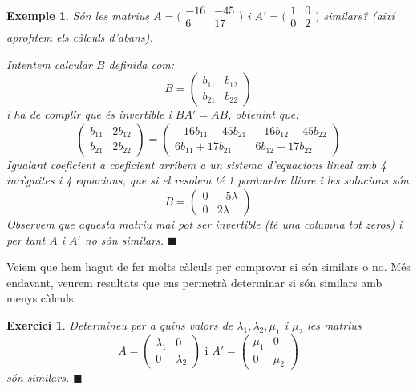 \documentclass[
  11pt,
]{book}
\numberwithin{dummy}{section}
\theoremstyle{maincolornumbox}
\newtheorem{exerciseT}{Exercici}[chapter]
\theoremstyle{blacknumex}
\newtheorem{exampleT}{Exemple}[chapter]
\theoremstyle{blacknumbox}
\theoremstyle{maincolornum}
\newenvironment{exercise}{\begin{eBox}\begin{exerciseT}}{\hfill{\color{maincolor}\tiny\ensuremath{\blacksquare}}\end{exerciseT}\end{eBox}}
\newenvironment{example}{\begin{exampleT}}{\hfill{\tiny\ensuremath{\blacksquare}}\end{exampleT}}
\begin{document}
\begin{example}
Són les matrius
\(A=\big(\begin{smallmatrix} -16 & -45 \\ 6 & 17\end{smallmatrix}\big)\)
i \(A'=\big(\begin{smallmatrix} 1 & 0 \\ 0 & 2 \end{smallmatrix}\big)\)
similars? (així aprofitem els càlculs d'abans).

Intentem calcular \(B\) definida com:
\[B=\begin{pmatrix} b_{11} & b_{12} \\ b_{21} & b_{22} \end{pmatrix}\] i
ha de complir que és invertible i \(BA'=AB\), obtenint que:
\[\begin{pmatrix}
    b_{11} & 2b_{12} \\ b_{21} & 2b_{22}
    \end{pmatrix}
    =
    \begin{pmatrix}
    -16b_{11}-45b_{21} & -16b_{12}-45b_{22}\\ 6b_{11}+17b_{21} & 6b_{12}+17b_{22}
    \end{pmatrix}\] Igualant coeficient a coeficient arribem a un
sistema d'equacions lineal amb 4 incògnites i 4 equacions, que si el
resolem té 1 paràmetre lliure i les solucions són \[B=\begin{pmatrix}
    0 & -5\lambda \\  0 & 2\lambda 
    \end{pmatrix}\] Observem que aquesta matriu mai pot ser invertible
(té una columna tot zeros) i per tant \(A\) i \(A'\) no són similars.
\end{example}

Veiem que hem hagut de fer molts càlculs per comprovar si són similars o
no. Més endavant, veurem resultats que ens permetrà determinar si són
similars amb menys càlculs.

\begin{exercise}
Determineu per a quins valors de \(\lambda_1, \lambda_2, \mu_1\) i \(\mu_2\)
les matrius \[A=\begin{pmatrix}
    \lambda_1 & 0 \\ 0 & \lambda_2
    \end{pmatrix}
    \text{ i }
    A'=\begin{pmatrix}
    \mu_1 & 0 \\ 0 & \mu_2
    \end{pmatrix}\] són similars.
\end{exercise}
\end{document}
